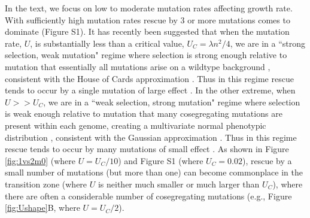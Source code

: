 \documentclass[9pt,twocolumn,twoside,lineno]{gsajnl}
\begin{document}
In the text, we focus on low to moderate mutation rates affecting growth rate.
With sufficiently high mutation rates rescue by 3 or more mutations comes to dominate (Figure S1).
It has recently been suggested that when the mutation rate, $U$, is substantially less than a critical value, $U_C = \lambda n^2/4$, we are in a ``strong selection, weak mutation" regime where selection is strong enough relative to mutation that essentially all mutations arise on a wildtype background \citep{martin2016nonstationary}, consistent with the House of Cards approximation \citep{turelli1984heritable,turelli1985effects}.
Thus in this regime rescue tends to occur by a single mutation of large effect \citep{Anciaux2018}.
In the other extreme, when $U>>U_C$, we are in a ``weak selection, strong mutation" regime where selection is weak enough relative to mutation that many cosegregating mutations are present within each genome, creating a multivariate normal phenotypic distribution \citep{martin2016nonstationary}, consistent with the Gaussian approximation \citep{Kimura1965,lande1980genetic}.
Thus in this regime rescue tends to occur by many mutations of small effect \citep{anciaux2019population}.
As shown in Figure \ref{fig:1vs2m0} (where $U = U_C / 10$) and Figure S1 (where $U_C=0.02$), rescue by a small number of mutations (but more than one) can become commonplace in the transition zone (where $U$ is neither much smaller or much larger than $U_C$), where there are often a considerable number of cosegregating mutations (e.g., Figure \ref{fig:Ushape}B, where $U = U_C/2$).
\end{document}
